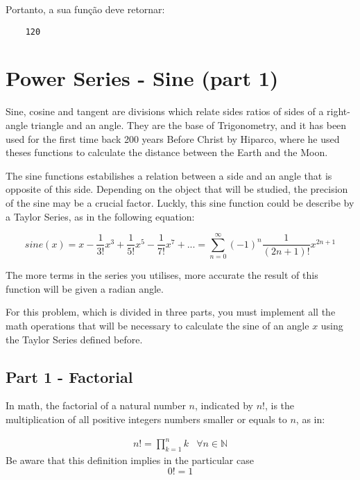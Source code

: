 Portanto, a sua função deve retornar:
\begin{lstlisting}
	120
\end{lstlisting}

\newpage

\section{Power Series - Sine (part 1)}
Sine, cosine and tangent are divisions which relate sides ratios of sides of a right-angle triangle and an angle. They are the base of Trigonometry, and it has been used for the first time back 200 years Before Christ by Hiparco, where he used theses functions to calculate the distance between the Earth and the Moon. 

The sine functions estabilishes a relation between a side and an angle that is opposite of this side. Depending on the object that will be studied, the precision of the sine may be a crucial factor. Luckly, this sine function could be describe by a Taylor Series, as in the following equation:

\begin{equation*}
	sine(x) = x - \frac{1}{3!}x^3 + \frac{1}{5!}x^5-\frac{1}{7!}x^7+...=\sum_{n = 0}^{\infty }(-1)^n\frac{1}{(2n + 1)!}x^{2n + 1}
\end{equation*}

The more terms in the series you utilises, more accurate the result of this function will be given a radian angle.


For this problem, which is divided in three parts, you must implement all the math operations that will be necessary to calculate the sine of an angle $x$ using the Taylor Series defined before.

\subsection*{Part 1 - Factorial}
In math, the factorial of a natural number $n$, indicated by $n!$, is the multiplication of all positive integers numbers smaller or equals to $n$, as in:

\begin{equation*}
	\begin{matrix}
		n! = \prod_{k=1}^{n}k  & \forall n\in\mathbb{N}
	\end{matrix}
\end{equation*}
Be aware that this definition implies in the particular case
\begin{equation*}
	0! = 1
\end{equation*}

